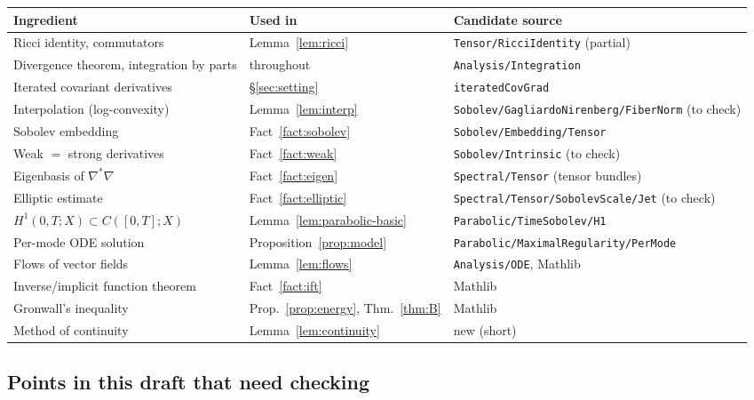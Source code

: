 \documentclass[11pt,reqno]{amsart}
\theoremstyle{definition}
\theoremstyle{remark}
\newcommand{\Lap}{\nabla^{*}\nabla}
\numberwithin{equation}{section}
\begin{document}
\medskip
\begin{center}
\footnotesize
\begin{tabular}{@{}p{4.1cm}p{2.9cm}p{6.4cm}@{}}
\toprule
Ingredient & Used in & Candidate source\\
\midrule
Ricci identity, commutators & Lemma~\ref{lem:ricci} & \cite{DGlib} \texttt{Tensor/RicciIdentity} (partial)\\
Divergence theorem, integration by parts & throughout & \cite{DGlib} \texttt{Analysis/Integration}\\
Iterated covariant derivatives & \S\ref{sec:setting} & \cite{DGlib} \texttt{iteratedCovGrad}\\
Interpolation (log-convexity) & Lemma~\ref{lem:interp} & \cite{DGlib} \texttt{Sobolev/GagliardoNirenberg/\allowbreak FiberNorm} (to check)\\
Sobolev embedding & Fact~\ref{fact:sobolev} & \cite{DGlib} \texttt{Sobolev/Embedding/Tensor}\\
Weak $=$ strong derivatives & Fact~\ref{fact:weak} & \cite{DGlib} \texttt{Sobolev/Intrinsic} (to check)\\
Eigenbasis of $\Lap$ & Fact~\ref{fact:eigen} & \cite{DGlib} \texttt{Spectral/Tensor} (tensor bundles)\\
Elliptic estimate & Fact~\ref{fact:elliptic} & \cite{DGlib} \texttt{Spectral/Tensor/\allowbreak SobolevScale/Jet} (to check)\\
$H^1(0,T;X)\subset C([0,T];X)$ & Lemma~\ref{lem:parabolic-basic} & \cite{DGlib} \texttt{Parabolic/TimeSobolev/H1}\\
Per-mode ODE solution & Proposition~\ref{prop:model} & \cite{DGlib} \texttt{Parabolic/\allowbreak MaximalRegularity/PerMode}\\
Flows of vector fields & Lemma~\ref{lem:flows} & \cite{DGlib} \texttt{Analysis/ODE}, Mathlib\\
Inverse/implicit function theorem & Fact~\ref{fact:ift} & Mathlib\\
Gronwall's inequality & Prop.~\ref{prop:energy}, Thm.~\ref{thm:B} & Mathlib\\
Method of continuity & Lemma~\ref{lem:continuity} & new (short)\\
\bottomrule
\end{tabular}
\end{center}

\subsection{Points in this draft that need checking}
\end{document}
